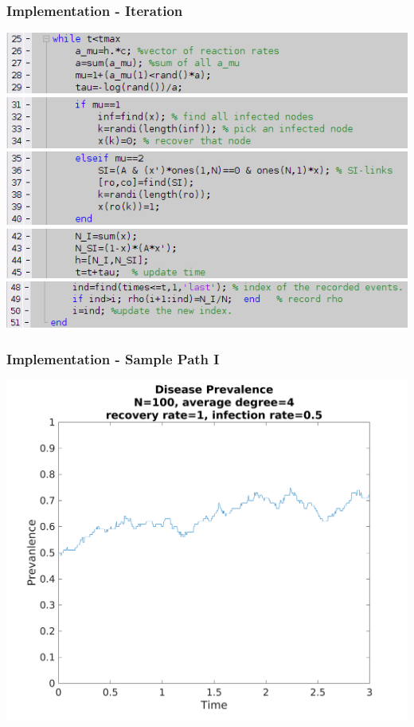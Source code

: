 \documentclass{beamer}
\begin{document}
\begin{frame}
 \frametitle{Implementation - Iteration}
\includegraphics[width=\linewidth]{iter1.png}\\
\includegraphics[width=\linewidth]{iter2.png}\\
\includegraphics[width=\linewidth]{iter3.png}\\
\includegraphics[width=\linewidth]{iter4.png}\\
\vspace{2ex}
\includegraphics[width=\linewidth]{iter5.png}
\end{frame}

\begin{frame}
 \frametitle{Implementation - Sample Path I}
\centering
\includegraphics[width=.75\textwidth]{samplepath3secnorew.png}
\end{frame}
\end{document}

